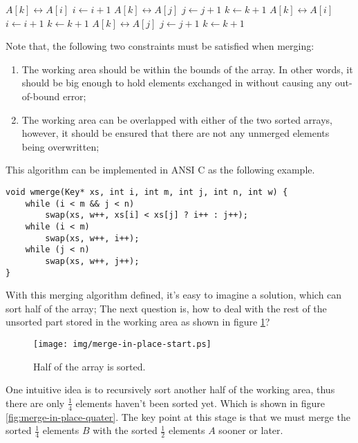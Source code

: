 \documentclass[UTF8]{article}
\begin{document}
\begin{algorithmic}[1]
\Procedure{Merge}{$A, [i, m), [j, n), k$}
      \State {} $A[k] \leftrightarrow A[i]$
      \State $i \gets i + 1$
    \Else
      \State {} $A[k] \leftrightarrow A[j]$
      \State $j \gets j + 1$
    \EndIf
    \State $k \gets k + 1$
  \EndWhile
    \State {} $A[k] \leftrightarrow A[i]$
    \State $i \gets i + 1$
    \State $k \gets k + 1$
  \EndWhile
    \State {} $A[k] \leftrightarrow A[j]$
    \State $j \gets j + 1$
    \State $k \gets k + 1$
  \EndWhile
\EndProcedure
\end{algorithmic}

Note that, the following two constraints must be satisfied when merging:

\begin{enumerate}
\item The working area should be within the bounds of the array. In other words, it should be big
enough to hold elements exchanged in without causing any out-of-bound error;
\item The working area can be overlapped with either of the two sorted arrays, however, it should
be ensured that there are not any unmerged elements being overwritten;
\end{enumerate}

This algorithm can be implemented in ANSI C as the following example.

\lstset{language=C}
\begin{lstlisting}
void wmerge(Key* xs, int i, int m, int j, int n, int w) {
    while (i < m && j < n)
        swap(xs, w++, xs[i] < xs[j] ? i++ : j++);
    while (i < m)
        swap(xs, w++, i++);
    while (j < n)
        swap(xs, w++, j++);
}
\end{lstlisting}

With this merging algorithm defined, it's easy to imagine a solution, which can sort
half of the array; The next question is, how to deal with the rest of the unsorted part
stored in the working area as shown in figure \ref{fig:merge-in-place-start}?

\begin{figure}[htbp]
 \centering
 \texttt{[image: img/merge-in-place-start.ps]}
 \caption{Half of the array is sorted.}
 \label{fig:merge-in-place-start}
\end{figure}

One intuitive idea is to recursively sort another half of the working area, thus there are
only $\frac{1}{4}$ elements haven't been sorted yet. Which is shown in figure \ref{fig:merge-in-place-quater}.
The key point at this stage is that we must merge the sorted $\frac{1}{4}$ elements $B$
with the sorted $\frac{1}{2}$ elements $A$ sooner or later.
\end{document}
